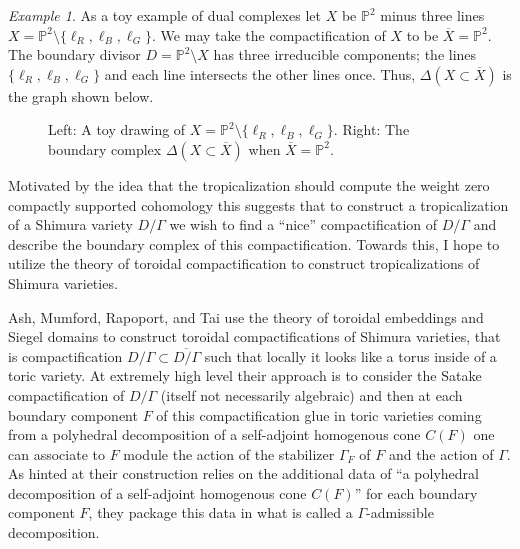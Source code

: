 \documentclass[11pt,reqno]{amsart}
\theoremstyle{remark}
\newtheorem{example}[lemma]{Example}
\newcommand{\PP}{\mathbb{P}}
\begin{document}
\begin{example}
As a toy example of dual complexes let $X$ be $\PP^{2}$ minus three lines $X=\PP^{2}\setminus\{\ell_{R},\ell_{B},\ell_{G}\}$. We may take the compactification of $X$ to be $\overline{X}=\PP^{2}$. The boundary divisor $D=\PP^{2}\setminus X$ has three irreducible components; the lines $\{\ell_{R},\ell_{B},\ell_{G}\}$ and each line intersects the other lines once. Thus, $\Delta(X\subset \overline{X})$ is the graph shown below. 
\begin{figure}[H]
\quad \quad 
{}
\caption{Left: A toy drawing of $X=\PP^{2}\setminus\{\ell_{R},\ell_{B},\ell_{G}\}$. Right: The boundary complex $\Delta(X\subset \overline{X})$ when $\overline{X}=\PP^{2}$.}
\end{figure}
\end{example}


Motivated by the idea that the tropicalization should compute the weight zero compactly supported cohomology this suggests that to construct a tropicalization of a Shimura variety $D/\Gamma$ we wish to find a ``nice'' compactification of $D/\Gamma$ and describe the boundary complex of this compactification. Towards this, I hope to utilize the theory of toroidal compactification to construct tropicalizations of Shimura varieties.

Ash, Mumford, Rapoport, and Tai use the theory of toroidal embeddings and Siegel domains to construct toroidal compactifications of Shimura varieties, that is compactification $D/\Gamma\subset \overline{D/\Gamma}$ such that locally it looks like a torus inside of a toric variety. At extremely high level their approach is to consider the Satake compactification of $D/\Gamma$ (itself not necessarily algebraic) and then at each boundary component $F$ of this compactification glue in toric varieties coming from a polyhedral decomposition of a self-adjoint homogenous cone $C(F)$ one can associate to $F$ module the action of the stabilizer $\Gamma_{F}$ of $F$ and the action of $\Gamma$. As hinted at their construction relies on the additional data of ``a polyhedral decomposition of a self-adjoint homogenous cone $C(F)$'' for each boundary component $F$, they package this data in what is called a $\Gamma$-admissible decomposition.
\end{document}
